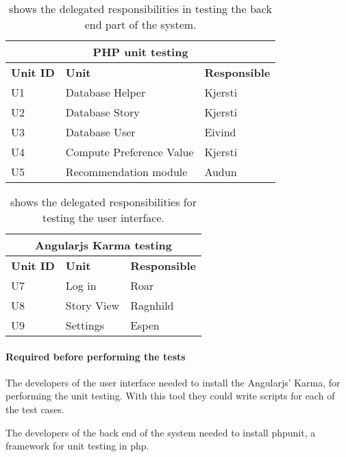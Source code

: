 \begin{table}[H]
	\begin{center}
		\begin{tabular}{ | l | l | l |}
			\hline
			\multicolumn{3}{|c|}{\textbf{PHP unit testing}} \\
			\hline
			\textbf{Unit ID} & \textbf{Unit} & \textbf{Responsible} \\ \hline
			U1 & Database Helper & Kjersti \\ \hline
			U2 & Database Story & Kjersti \\ \hline
			U3 & Database User & Eivind \\ \hline			
			U4 & Compute Preference Value & Kjersti \\ \hline			
			U5 & Recommendation module & Audun \\ \hline
		\end{tabular}
	\end{center}
	\caption{shows the delegated responsibilities in testing the back end part of the system.}
	\label{Tab_phptesting}
\end{table}

\begin{table}[H]
	\begin{center}
		\begin{tabular}{ | l | l | l |}
			\hline
			\multicolumn{3}{|c|}{\textbf{Angularjs Karma testing}} \\
			\hline
			\textbf{Unit ID} & \textbf{Unit} & \textbf{Responsible} \\ \hline
			U7 & Log in & Roar \\ \hline
			U8 & Story View & Ragnhild \\ \hline
			U9 & Settings & Espen \\ \hline
		\end{tabular}
	\end{center}
	\caption{shows the delegated responsibilities for testing the user interface.}
	\label{Tab_karmatesting}
\end{table}

\paragraph {Required before performing the tests}
The developers of the user interface needed to install the Angularjs' Karma, for performing the unit testing. With this tool they could write scripts for each of the test cases.\newline

The developers of the back end of the system needed to install phpunit, a framework for unit testing in php.\newline

